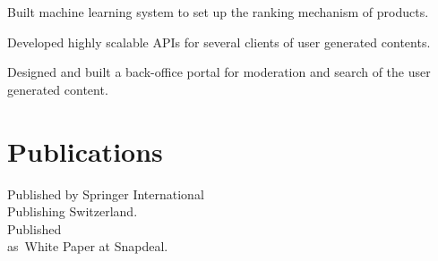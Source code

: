 \documentclass[]{rajnikant-resume-openfont}
\begin{document}
\begin{minipage}[t]{0.66\textwidth}
\begin{tightemize}
\end{tightemize}
\sectionsep


\begin{tightemize}
\item Built machine learning system to set up the ranking mechanism of products. 
\item Developed highly scalable APIs for several clients of user generated contents.
\item Designed and built a back-office portal for moderation  and search of the user generated content.
\end{tightemize}
\sectionsep





\section{Publications}
\textbullet{}  \href{https://rd.springer.com/chapter/10.1007/978-3-319-32467-8_118}{ } Published by Springer International \\ \hspace{9pt}Publishing Switzerland. \\
\textbullet{}   Published \\ \hspace{8pt} as White Paper at Snapdeal.
\sectionsep



\end{minipage}
\end{document}
